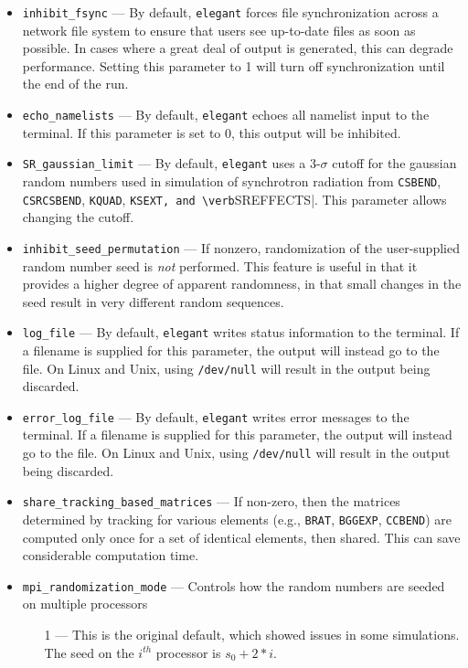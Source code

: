 \documentclass[11pt]{article}
\begin{document}
\begin{itemize}
\item \verb|inhibit_fsync| --- By default, \verb|elegant| forces file synchronization across a network file system
  to ensure that users see up-to-date files as soon as possible.  In cases where a great deal of output is generated,
  this can degrade performance.  Setting this parameter to 1 will turn off synchronization until the end of the run.
\item \verb|echo_namelists| --- By default, \verb|elegant| echoes all namelist input to the terminal.  If this parameter
  is set to 0, this output will be inhibited.
\item \verb|SR_gaussian_limit| --- By default, \verb|elegant| uses a 3-$\sigma$ cutoff for the gaussian random numbers used
  in simulation of synchrotron radiation from \verb|CSBEND|, \verb|CSRCSBEND|, \verb|KQUAD|, \verb|KSEXT, and \verb|SREFFECTS|.
  This parameter allows changing the cutoff.
\item \verb|inhibit_seed_permutation| --- If nonzero, randomization of the user-supplied random number seed is {\em not} performed.
  This feature is useful in that it provides a higher degree of apparent randomness, in that small changes in the seed result
  in very different random sequences.
\item \verb|log_file| --- By default, \verb|elegant| writes status information to the terminal.  If a filename is supplied
  for this parameter, the output will instead go to the file.  On Linux and Unix, using \verb|/dev/null| will result in 
  the output being discarded.
\item \verb|error_log_file| --- By default, \verb|elegant| writes error messages to the terminal.  If a filename is supplied
  for this parameter, the output will instead go to the file.  On Linux and Unix, using \verb|/dev/null| will result in 
  the output being discarded.
\item \verb|share_tracking_based_matrices| --- If non-zero, then the matrices determined by tracking for various elements
  (e.g., \verb|BRAT|, \verb|BGGEXP|, \verb|CCBEND|) are computed only once for a set of identical elements, then shared.
  This can save considerable computation time.
\item \verb|mpi_randomization_mode| --- Controls how the random numbers are seeded on multiple processors
  \begin{itemize}
    \item[1] --- This is the original default, which showed issues in some simulations. The seed on the $i^{th}$ processor is $s_0+2*i$.

\end{itemize}
\end{itemize}
\end{document}
